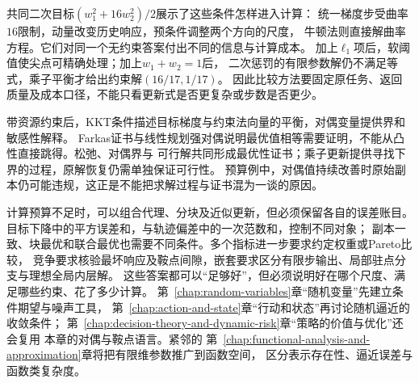 共同二次目标$(w_1^2+16w_2^2)/2$展示了这些条件怎样进入计算：
统一梯度步受曲率$16$限制，动量改变历史响应，预条件调整两个方向的尺度，
牛顿法则直接解曲率方程。它们对同一个无约束答案付出不同的信息与计算成本。
加上$\ell_1$项后，软阈值使尖点可精确处理；加上$w_1+w_2=1$后，
二次惩罚的有限参数解仍不满足等式，乘子平衡才给出约束解$(16/17,1/17)$。
因此比较方法要固定原任务、返回质量及成本口径，不能只看更新式是否更复杂或步数是否更少。

带资源约束后，KKT条件描述目标梯度与约束法向量的平衡，对偶变量提供界和敏感性解释。
Farkas证书与线性规划强对偶说明最优值相等需要证明，不能从凸性直接跳得。松弛、对偶界与
可行解共同形成最优性证书；乘子更新提供寻找下界的过程，原解恢复仍需单独保证可行性。
预算例中，对偶值持续改善时原始副本仍可能违规，这正是不能把求解过程与证书混为一谈的原因。

计算预算不足时，可以组合代理、分块及近似更新，但必须保留各自的误差账目。
目标下降中的平方误差和，与轨迹偏差中的一次范数和，控制不同对象；
副本一致、块最优和联合最优也需要不同条件。多个指标进一步要求约定权重或Pareto比较，
竞争要求核验最坏响应及鞍点间隙，嵌套要求区分有限步输出、局部驻点分支与理想全局内层解。
这些答案都可以“足够好”，但必须说明好在哪个尺度、满足哪些约束、花了多少计算。
第~\ref{chap:random-variables}章“随机变量”先建立条件期望与噪声工具，
第~\ref{chap:action-and-state}章“行动和状态”再讨论随机逼近的收敛条件；
第~\ref{chap:decision-theory-and-dynamic-risk}章“策略的价值与优化”还会复用
本章的对偶与鞍点语言。紧邻的
第~\ref{chap:functional-analysis-and-approximation}章将把有限维参数推广到函数空间，
区分表示存在性、逼近误差与函数类复杂度。

